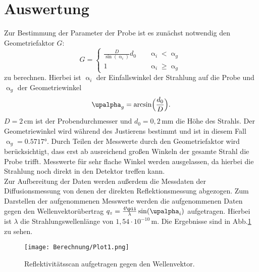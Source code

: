 \section{Auswertung}
Zur Bestimmung der Parameter der Probe ist es zunächst notwendig den Geometriefaktor $G$:
\begin{equation}
  G =
     \begin{cases}
       \frac{D}{\sin\left(\upalpha_i\right)}{d_0} &\quad\upalpha_i<\upalpha_g\\
       1 &\quad\upalpha_i\geq\upalpha_g
     \end{cases}
\end{equation}
zu berechnen. Hierbei ist $\upalpha_i$ der Einfallswinkel der Strahlung auf die Probe und $\upalpha_g$ der Geometriewinkel
\begin{equation}
\upalpha_g=\arcsin\Bigl(\frac{d_0}{D}\Bigr).
\end{equation}
$D=2\,\si{\cm}$ ist der Probendurchmesser und $d_0=0{,}2\,\si{\mm}$ die Höhe des Strahls. Der Geometriewinkel wird während des Justierens bestimmt und ist in diesem Fall $\upalpha_g=0.5717°$.
Durch Teilen der Messwerte durch den Geometriefaktor wird berücksichtigt, dass erst ab ausreichend großen Winkeln der gesamte Strahl die Probe trifft. Messwerte für sehr flache Winkel werden ausgelassen, da hierbei die Strahlung noch direkt in den Detektor treffen kann.\\
Zur Aufbereitung der Daten werden außerdem die Messdaten der Diffusionsmessung von denen der direkten Reflektionsmessung abgezogen. Zum Darstellen der aufgenommenen Messwerte werden die aufgenommenen Daten gegen den Wellenvektorübertrag $q_z=\frac{4\pii}{\lambda}\sin(\upalpha_i)$ aufgetragen. Hierbei ist $\lambda$ die Strahlungswellenlänge von $1{,}54\cdot10^{-10}\,\si{\m}$. Die Ergebnisse sind in Abb.\ref{Plot1} zu sehen.
\begin{figure}[H]
  \centering
  \texttt{[image: Berechnung/Plot1.png]}
  \caption{Reflektivitätsscan aufgetragen gegen den Wellenvektor.}
  \label{Plot1}
\end{figure}
